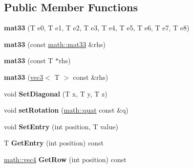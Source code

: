\subsection*{Public Member Functions}
\begin{DoxyCompactItemize}
\item 
\hypertarget{classmath_1_1mat33_ab00020cb1e714e31f4b5d81a02e085d7}{
{\bfseries mat33} (T e0, T e1, T e2, T e3, T e4, T e5, T e6, T e7, T e8)}
\label{classmath_1_1mat33_ab00020cb1e714e31f4b5d81a02e085d7}

\item 
\hypertarget{classmath_1_1mat33_ac2436300451351d4aae2d318aca1c340}{
{\bfseries mat33} (const \hyperlink{classmath_1_1mat33}{math::mat33} \&rhs)}
\label{classmath_1_1mat33_ac2436300451351d4aae2d318aca1c340}

\item 
\hypertarget{classmath_1_1mat33_ac084f09a588f7c9a1e8874d0b9970339}{
{\bfseries mat33} (const T $\ast$rhs)}
\label{classmath_1_1mat33_ac084f09a588f7c9a1e8874d0b9970339}

\item 
\hypertarget{classmath_1_1mat33_a0603d861a667d254189af5023032854a}{
{\bfseries mat33} (\hyperlink{classmath_1_1vec3}{vec3}$<$ T $>$ const \&rhs)}
\label{classmath_1_1mat33_a0603d861a667d254189af5023032854a}

\item 
\hypertarget{classmath_1_1mat33_af8e0d8e83ec53242150b93da7ac13a67}{
void {\bfseries SetDiagonal} (T x, T y, T z)}
\label{classmath_1_1mat33_af8e0d8e83ec53242150b93da7ac13a67}

\item 
\hypertarget{classmath_1_1mat33_a99744c8d99219cc5d69c8561cbc3eed6}{
void {\bfseries setRotation} (\hyperlink{classmath_1_1quat}{math::quat} const \&q)}
\label{classmath_1_1mat33_a99744c8d99219cc5d69c8561cbc3eed6}

\item 
\hypertarget{classmath_1_1mat33_a0523c2ae9382877a5b1525438e144040}{
void {\bfseries SetEntry} (int position, T value)}
\label{classmath_1_1mat33_a0523c2ae9382877a5b1525438e144040}

\item 
\hypertarget{classmath_1_1mat33_a307e6a177baf2bf0bd7f46a0353bd8c4}{
T {\bfseries GetEntry} (int position) const }
\label{classmath_1_1mat33_a307e6a177baf2bf0bd7f46a0353bd8c4}

\item 
\hypertarget{classmath_1_1mat33_a580aec1372905592ff3e30d6856176ea}{
\hyperlink{classmath_1_1vec4}{math::vec4} {\bfseries GetRow} (int position) const }
\label{classmath_1_1mat33_a580aec1372905592ff3e30d6856176ea}


\end{DoxyCompactItemize}
